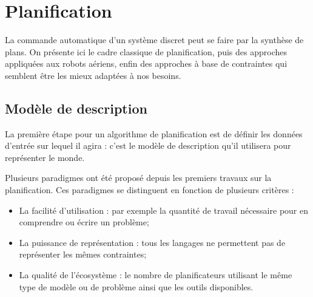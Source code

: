 \section{Planification}
La commande automatique d'un système discret peut se faire par la synthèse de plans. On présente ici le cadre classique de planification, puis des approches appliquées aux robots aériens, enfin des approches à base de contraintes qui semblent être les mieux adaptées à nos besoins.

\subsection{Modèle de description}

La première étape pour un algorithme de planification est de définir les données d'entrée sur lequel il agira : c'est le modèle de description qu'il utilisera pour représenter le monde.

Plusieurs paradigmes ont été proposé depuis les premiers travaux sur la planification. Ces paradigmes se distinguent en fonction de plusieurs critères :

\begin{itemize}
	\item La facilité d'utilisation : par exemple la quantité de travail nécessaire pour en comprendre ou écrire un problème;
	\item La puissance de représentation : tous les langages ne permettent pas de représenter les mêmes contraintes;
	\item La qualité de l'écosystème : le nombre de planificateurs utilisant le même type de modèle ou de problème ainsi que les outils disponibles.
\end{itemize}

